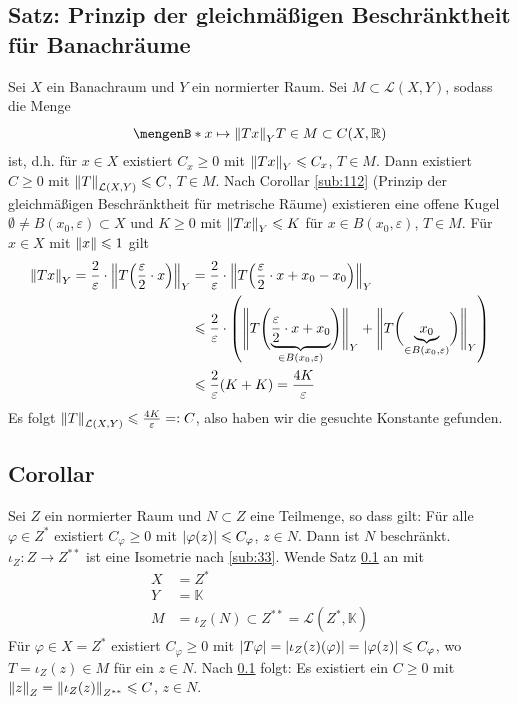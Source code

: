 \subsection{Satz: Prinzip der gleichmäßigen Beschränktheit für Banachräume} %
\label{sub:35}
Sei $X$ ein Banachraum und $Y$ ein normierter Raum. Sei $M \subset \mathcal{L}(X,Y)$, sodass die Menge  
\[
	\set[{x \mapsto \norm[Y]{T x}}]{T \in M \rule{0cm}{1em}} \subset C(X,\mathds{R} )
\]
 ist, d.h. für $x \in X$ existiert $C_x \ge 0$ mit $\norm[Y]{T x} \le C_x$, $T \in M$. Dann existiert $C \ge 0$ mit 
$\norm[\mathcal{L}(X,Y)]{T} \le C$, $T \in M$.
Nach Corollar \ref{sub:112} (Prinzip der gleichmäßigen Beschränktheit für metrische Räume) existieren eine offene Kugel $\emptyset \not= B(x_0,\varepsilon)\subset X$ und 
$K \ge 0$ mit $\norm[Y]{T x} \le K$ für $x \in B(x_0, \varepsilon)$, $T \in M$. Für $x \in X$ mit $\norm{x} \le 1$ gilt 
\begin{align*}
	\norm[Y]{T x} = \frac{2}{\varepsilon} \cdot  \norm[Y]{T \enbrace*{\frac{\varepsilon}{2} \cdot x}} &= \frac{2}{\varepsilon} \cdot 
	\norm[Y]{T \enbrace*{\frac{\varepsilon}{2} \cdot x + x_0 - x_0 } }  \\
	&\le \frac{2}{\varepsilon} \cdot   \enbrace*{ \doppelstrich[\Bigg]{T \enbrace[\Bigg]{\underbrace{\frac{\varepsilon}{2} \cdot x + x_0}_{\in B(x_0,\varepsilon)} } }_Y +
	 \doppelstrich[\Bigg]{T  \enbrace[\bigg]{\underbrace{x_0}_{\in B(x_0,\varepsilon)}}}_Y} \\
	&\le \frac{2}{\varepsilon} (K+K) = \frac{4K}{\varepsilon}   
\end{align*}
Es folgt $\norm[\mathcal{L}(X,Y)]{T} \le \frac{4 K}{\varepsilon} =: C$, also haben wir die gesuchte Konstante gefunden. \bewende

\subsection[Corollar über Beschränktheit einer Teilmenge eines normierten Raumes]{Corollar} %
\label{sub:36}
Sei $Z$ ein normierter Raum und $N \subset Z$ eine Teilmenge, so dass gilt: Für alle $\varphi \in Z^*$ existiert $C_\varphi \ge 0$ mit $\abs*{\varphi(z)} \le C_\varphi$, 
$z \in N$.  Dann ist $N$ beschränkt.
$\iota_Z \colon Z \to Z^{**}$ ist eine Isometrie nach \ref{sub:33}. Wende Satz \ref{sub:35} an mit 
\begin{align*}
	X &=Z^{*} \\
	Y &=\mathds{K} \\
	M &= \iota_Z(N) \subset Z^{**}= \mathcal{L}(Z^*,\mathds{K})
\end{align*}
Für $\varphi \in X = Z^{*}$ existiert $C_\varphi \ge 0$ mit $\abs*{T \varphi} = \abs*{\iota_Z(z) (\varphi)} = \abs*{\varphi(z)} \le C_\varphi$, wo $T= \iota_Z(z) \in M$
für ein $z \in N$. Nach \ref{sub:35} folgt: Es existiert ein $C \ge 0$ mit $\norm[Z]{z} = \norm[Z^{**}]{\iota_Z(z)}  \le C$, $z \in N$. \bewende

